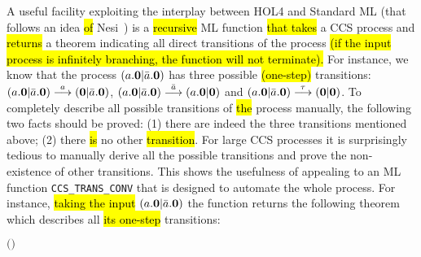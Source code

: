 A useful facility exploiting the interplay
between HOL4 and Standard ML (that follows an idea \hl{of} Nesi~\cite{Nesi:1992ve})
 is a \hl{recursive} ML function \hl{that takes} a CCS process and \hl{returns} a theorem indicating all
  direct transitions of the process \hl{(if the input process is
 infinitely branching, the function will not terminate).}
For instance, we know that the process $(a.{\boldsymbol 0} | \bar{a}.{\boldsymbol 0})$ has three
possible \hl{(one-step)} transitions: $(a.{\boldsymbol 0} | \bar{a}.{\boldsymbol 0}) \overset{a}{\longrightarrow}
({\boldsymbol 0} | \bar{a}.{\boldsymbol 0})$, $(a.{\boldsymbol 0} | \bar{a}.{\boldsymbol 0})
\overset{\bar{a}}{\longrightarrow} (a.{\boldsymbol 0} | {\boldsymbol 0})$ and $(a.{\boldsymbol 0} | \bar{a}.{\boldsymbol 0})
\overset{\tau}{\longrightarrow} ({\boldsymbol 0} | {\boldsymbol 0})$.
To completely describe all possible transitions of \hl{the} process manually, the
following two facts should be proved: (1) there are indeed the three
  transitions mentioned above; (2) there \hl{is} no other
  \hl{transition}. For large CCS processes it is surprisingly tedious to manually derive
all the possible transitions and prove the non-existence of other transitions.
This shows the usefulness of appealing to an ML function
\texttt{CCS\_TRANS\_CONV} that is designed to automate the whole process.
For instance, \hl{taking the input} $(a.{\boldsymbol 0} | \bar{a}.{\boldsymbol 0})$ the function returns the
following theorem which describes all \hl{its one-step} transitions:
\begin{alltt}
\HOLTokenTurnstile{} \HOLConst{\HOLTokenInputAct} \HOLSymConst{\ensuremath{\ldotp}} \HOLSymConst{\ensuremath{\mid}} \HOLConst{\HOLTokenOutputAct} \HOLSymConst{\ensuremath{\ldotp}} \HOLTokenTransBegin{}\HOLTokenTransEnd {} \HOLSymConst{\HOLTokenEquiv{}}
   \ensuremath{(} \HOLSymConst{\ensuremath{=}} \HOLConst{\HOLTokenInputAct}  \HOLSymConst{\HOLTokenConj{}}  \HOLSymConst{\ensuremath{=}}  \HOLSymConst{\ensuremath{\mid}} \HOLConst{\HOLTokenOutputAct} \HOLSymConst{\ensuremath{\ldotp}} \HOLSymConst{\HOLTokenDisj{}}  \HOLSymConst{\ensuremath{=}} \HOLConst{\HOLTokenOutputAct}  \HOLSymConst{\HOLTokenConj{}}  \HOLSymConst{\ensuremath{=}} \HOLConst{\HOLTokenInputAct} \HOLSymConst{\ensuremath{\ldotp}} \HOLSymConst{\ensuremath{\mid}} \ensuremath{)} \HOLSymConst{\HOLTokenDisj{}}
    \HOLSymConst{\ensuremath{=}} \HOLSymConst{\ensuremath{\tau}} \HOLSymConst{\HOLTokenConj{}}  \HOLSymConst{\ensuremath{=}}  \HOLSymConst{\ensuremath{\mid}} 
\end{alltt}

